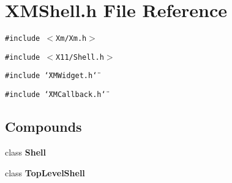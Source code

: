 \section{XMShell.h File Reference}
\label{XMShell_8h}
{\tt \#include $<$Xm/Xm.h$>$}\par
{\tt \#include $<$X11/Shell.h$>$}\par
{\tt \#include \char`\"{}XMWidget.h\char`\"{}}\par
{\tt \#include \char`\"{}XMCallback.h\char`\"{}}\par
\subsection*{Compounds}
\begin{CompactItemize}
\item 
class {\bf Shell}
\item 
class {\bf Top\-Level\-Shell}
\end{CompactItemize}
